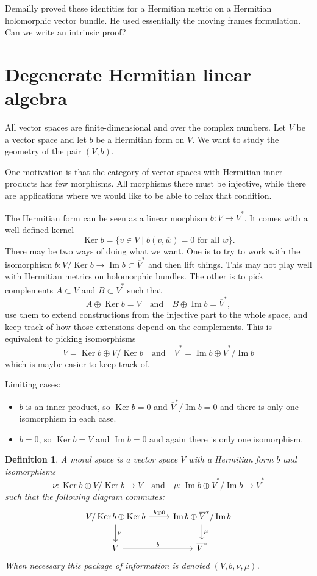 \documentclass[10pt,a4paper]{article}
\newtheorem{defi}[theo]{Definition}
\def\qandq{\quad\text{and}\quad}
\def\ov#1{\overline{#1}}
\DeclareMathOperator{\im}{Im}
\DeclareMathOperator{\Ker}{Ker}
\begin{document}
Demailly proved these identities for a Hermitian metric on a Hermitian holomorphic vector bundle. He used essentially the moving frames formulation. Can we write an intrinsic proof?



\section{Degenerate Hermitian linear algebra}
\label{sec:deglinalg}

All vector spaces are finite-dimensional and over the complex numbers. Let $V$ be a vector space and let $b$ be a Hermitian form on $V$. We want to study the geometry of the pair $(V,b)$.

One motivation is that the category of vector spaces with Hermitian inner products has few morphisms. All morphisms there must be injective, while there are applications where we would like to be able to relax that condition.

The Hermitian form can be seen as a linear morphism $b : V \to \ov V^*$. It comes with a well-defined kernel
\[
\Ker b = \{ v \in V \mid b(v, \ov w) = 0 \text{ for all $w$}\}.
\]
There may be two ways of doing what we want. One is to try to work with the isomorphism $b : V / \Ker b \to \im b \subset \ov V^*$ and then lift things. This may not play well with Hermitian metrics on holomorphic bundles. The other is to pick complements $A \subset V$ and $B \subset \ov V^*$ such that
\[
A \oplus \Ker b = V
\qandq
B \oplus \im b = \ov V^*,
\]
use them to extend constructions from the injective part to the whole space, and keep track of how those extensions depend on the complements. This is equivalent to picking isomorphisms
\[
V = \Ker b \oplus V / \Ker b
\qandq
\ov V^* = \im b \oplus \ov V^* / \im b
\]
which is maybe easier to keep track of.

Limiting cases:
\begin{itemize}
\item
$b$ is an inner product, so $\Ker b = 0$ and $\ov V^* / \im b = 0$ and there is only one isomorphism in each case.
\item
$b = 0$, so $\Ker b = V$ and $\im b = 0$ and again there is only one isomorphism.
\end{itemize}


\begin{defi}
A \emph{moral space} is a vector space $V$ with a Hermitian form $b$ and isomorphisms
\[
\nu : \Ker b \oplus V / \Ker b \to V
\qandq
\mu : \im b \oplus \ov V^* / \im b \to \ov V^*
\]
such that the following diagram commutes:
\[
\begin{tikzcd}
V / \Ker b \oplus \Ker b
\ar[d,"\nu"]
\ar[r,"b \oplus 0"] &
\im b \oplus \ov V^* / \im b
\ar[d,"\mu"]
\\
V \ar[r,"b"]  &
\ov V^*
\end{tikzcd}
\]
When necessary this package of information is denoted $(V,b,\nu,\mu)$.
\end{defi}
\end{document}
